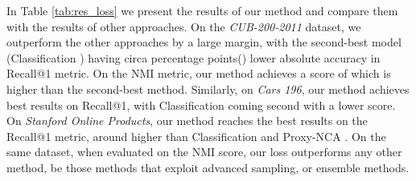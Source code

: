 \documentclass[runningheads]{llncs}
\begin{document}

 In Table \ref{tab:res_loss} we present the results of our method and compare them with the results of other approaches. On the \textit{CUB-200-2011} dataset, we outperform the other approaches by a large margin, with the second-best model (Classification \cite{DBLP:journals/corr/abs-1811-12649}) having circa  percentage points() lower absolute accuracy in Recall@1 metric. On the NMI metric, our method achieves a score of  which is   higher than the second-best method. Similarly, on \textit{Cars 196}, our method achieves best results on Recall@1, with Classification \cite{DBLP:journals/corr/abs-1811-12649} coming second with a  lower score. On \textit{Stanford Online Products}, our method reaches the best results on the Recall@1 metric, around  higher than Classification \cite{DBLP:journals/corr/abs-1811-12649} and Proxy-NCA \cite{DBLP:conf/iccv/Movshovitz-Attias17}. On the same dataset, when evaluated on the NMI score, our loss outperforms any other method, be those methods that exploit advanced sampling, or ensemble methods.
\end{document}
